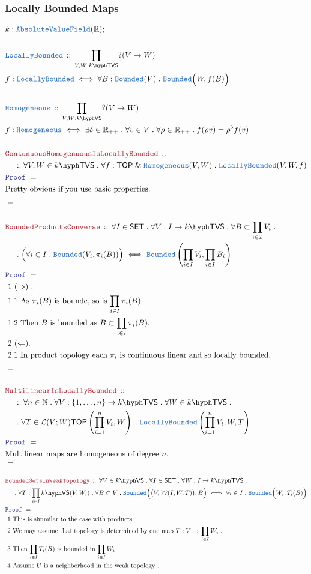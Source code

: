 \documentclass[12pt]{scrartcl}
\newcommand{\TYPE}[1]{\textcolor{NavyBlue}{\mathtt{#1}}}
\newcommand{\LOGIC}[1]{\textcolor{Blue}{\mathtt{#1}}}
\newcommand{\THM}[1]{\textcolor{Maroon}{\mathtt{#1}}}
\renewcommand{\.}{\; . \;}
\newcommand{\Theorem}[2]{& \THM{#1} \, :: \, #2 \\ & \Proof = \\ }
\newcommand{\DeclareType}[2]{& \TYPE{#1} \, :: \, #2 \\}
\newcommand{\DefineType}[3]{& #1 : \TYPE{#2} \iff #3 \\}
\newcommand{\NewLine}{\\ & \kern 1pc}
\newcommand{\Page}[1]{ \begin{align*} #1 \end{align*}   }
\newcommand{\Explain}[1]{& \text{#1.} \\}
\renewcommand{\And}{\; \& \;}
\newcommand{\Imply}{\Rightarrow}
\newcommand{\Reals}{\mathbb{R} }
\newcommand{\Nat}{\mathbb{N} }
\newcommand{\QED}{\; \square}
\newcommand{\EndProof}{& \QED \\}
\newcommand{\Proof}{\LOGIC{Proof} \; }
\newcommand{\I}{\mathcal{I}}
\newcommand{\SET}{\mathsf{SET}}
\newcommand{\TOP}{\mathsf{TOP}}
\newcommand{\Bounded}{\TYPE{Bounded}}
\renewcommand{\L}{\mathcal{L}}
\newcommand{\VS}[1]{#1\hyph\mathsf{VS}} %
\renewcommand{\L}{\mathcal{L}}
\newcommand{\W}{\mathcal{W}}
\renewcommand{\L}{\mathcal{L}}
\newcommand{\AVF}{\TYPE{AbsoluteValueField}}
\newcommand{\LO}{\TYPE{LocallyBounded}}
\newcommand{\Homog}{\TYPE{Homogeneous}}
\newcommand{\TVS}[1]{{#1}\hyph\mathsf{TVS}}
\begin{document}
\subsubsection{Locally Bounded Maps}
\Page{
	& k : \AVF(\Reals); \\
	\\
	\DeclareType{\LO}{\prod_{V,W: \TVS{k}} ?(V \to W)}
	\DefineType{f}{\LO}
	{
		\forall B : \Bounded(V) \. \Bounded\Big(W, f(B) \Big)
	}
	\\
	\DeclareType{Homogeneous}{ \prod_{V,W: \VS{k}} ?(V \to W)}
	\DefineType{f}{Homogeneous}{
		\exists \delta \in \Reals_{++} \.
		\forall v \in V \.
		\forall \rho \in \Reals_{++} \.
		f(\rho v) = \rho^\delta f(v)
	}
	\\
	\Theorem{ContunuousHomogenuousIsLocallyBounded}
	{
		\NewLine ::		
		\forall V,W\in \TVS{k} \. 
		\forall f : \TOP \And \Homog(V,W) \.
		\LO(V,W,f)
	}
	\Explain{Pretty obvious if you use basic properties}
	\EndProof
	\\
	\Theorem{BoundedProductsConverse}
	{
		\forall I \in \SET \.		
		\forall V : I \to \TVS{k} \.
		\forall B \subset \prod_{i \in \I} V_i \. \NewLine \.
		\Big(\forall i \in I \. \Bounded(V_i,\pi_i(B)) \Big)
		\iff
		\Bounded\left(\prod_{i\in I} V_i, \prod_{i \in I} B_i \right)
	}
	\Explain{ 1 ($\Imply$) } 
	\Explain{ 1.1 As $\pi_i(B)$ is bounde, so is $\prod_{i \in I} \pi_i(B)$}
	\Explain{ 1.2 Then $B$ is bounded as $B \subset \prod_{i \in I} \pi_i(B)$}
	\Explain{ 2 ($\Leftarrow$)}
	\Explain{ 2.1 In product topology each $\pi_i$ is continuous linear and so locally bounded}
	\EndProof
	\\
	\Theorem{MultilinearIsLocallyBounded}
	{
		\NewLine::		
		 \forall n \in \Nat \.  
		\forall V : \{1,\ldots,n \} \to \TVS{k} \.
		\forall W \in \TVS{k} \. \NewLine \.
		\forall T \in \L(V;W) \TOP\left( \prod^n_{i=1} V_i, W\right) \.
		\LO\left( \prod^n_{i=1} V_i,W,T\right)
	}
	\Explain{Multilinear maps are homogeneous of degree $n$}
	\EndProof
}\Page{
	\Theorem{BoundedSetsInWeakTopology}
	{
		\forall V \in \VS{k} \.
		\forall I \in \SET \.
		\forall W : I \to \TVS{k} \. \NewLine \.
		\forall T : \prod_{i \in I} \VS{k}(V,W_i) \.
		\forall  B \subset V \.
		\Bounded\Big( \big(V,\W(I,W,T)\big),B\Big)
		\iff
		\forall i \in I \. \Bounded\Big( W_i, T_i(B) \Big)
	}
	\Explain{
		1 This is simmilar to the case with products}
	\Explain{
		2 We may assume that topology is determined by one map
		$T : V \to \prod_{i \in I} W_i$
	}
	\Explain{
		3 Then $\prod_{i \in I} T_i(B)$ is bounded in $\prod_{i \in I} W_i$
	}
	\Explain{ 
		4 Assume $U$ is a neighborhood in the weak topology
}}
\end{document}
